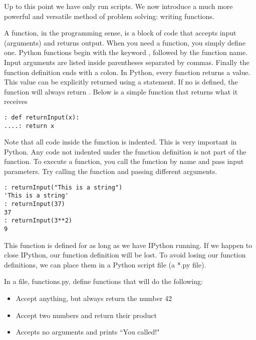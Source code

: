 

Up to this point we have only run scripts. We now introduce a much more powerful and versatile method of problem solving: writing functions.

A function, in the programming sense, is a block of code that accepts input (arguments) and returns output.  When you need a function, you simply define one.  Python functions begin with the keyword , followed by the function name.  Input arguments are listed inside parentheses separated by commas.  Finally the function definition ends with a colon.  In Python, every function returns a value. This value can be explicitly returned using a  statement.  If no  is defined, the function will always return .  Below is a simple function that returns what it receives
\begin{lstlisting}[style=python]
: def returnInput(x):
....: return x
\end{lstlisting}

Note that all code inside the function is indented.  This is very important in Python.  Any code not indented under the function definition is not part of the function.  To execute a function, you call the function by name and pass input parameters.  Try calling the function and passing different arguments.
\begin{lstlisting}[style=python]
: returnInput("This is a string")
'This is a string'
: returnInput(37)
37
: returnInput(3**2)
9
\end{lstlisting}

This function is defined for as long as we have IPython running.  If we happen to close IPython, our function definition will be lost.  To avoid losing our function definitions, we can place them in a Python script file (a *.py file).

\begin{problem}
In a file, functions.py, define functions that will do the following:
\begin{itemize}
\item Accept anything, but always return the number 42
\item Accept two numbers and return their product
\item Accepts no arguments and prints ``You called!"
\end{itemize}
\end{problem}

